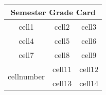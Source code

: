 \documentclass{article}
\begin{document}
\begin{tabular}{| c| c| c|}
\hline
\multicolumn{3}{|c|}{Semester Grade Card}\\
\hline
cell1 & cell2 & cell3\\
\hline
cell4 & cell5 & cell6\\
\hline
cell7 & cell8 & cell9\\
\hline
\multirow{2}{6em}{cellnumber} & cell11 & cell12\\ 
\cline{2-3}
 & cell13 & cell14\\
\hline
\end{tabular}
\end{document}
